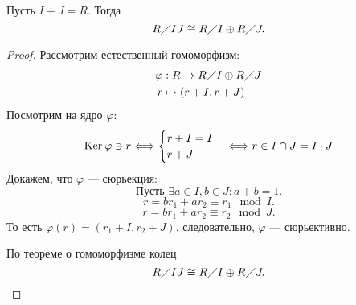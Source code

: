 \documentclass[11pt]{book}
\renewcommand{\ker}{{\mathop{\text{\rm Ker}}}\:}
\theoremstyle{definition}
\theoremstyle{plain}
\theoremstyle{plain}
\theoremstyle{definition}
\theoremstyle{remark}
\begin{document}
\begin{thm}
    Пусть $ I + J = R$. Тогда \[
	R \diagup  {IJ} \cong R \diagup I \oplus R \diagup  J
    .\] 
\end{thm}
\begin{proof}
    Рассмотрим естественный гомоморфизм:
    \begin{align*}
	\varphi & : R \to  R \diagup I \oplus R \diagup  J \\
	r & \mapsto (r + I, r + J)
    \end{align*}
    Посмотрим на ядро $ \varphi $:
    $$ \ker \varphi  \ni r \Longleftrightarrow 
    \begin{cases}
	    r + I = I \\
	    r + J
    \end{cases}
	 \Longleftrightarrow r \in  I \cap  J = I \cdot J
	$$
	Докажем, что $ \varphi $ --- сюрьекция:
	\[
	\text{Пусть } \exists  a \in I, b \in J: a + b = 1
	.\] 
	\[
	r = br_1+ar_2 \equiv r_1 \mod I
	.\] 
	\[
	r = br_1+ar_2 \equiv r_2 \mod J
	.\] 
	То есть $ \varphi (r) =  (r_1 + I, r_2 + J)$, следовательно, $ \varphi $ --- сюрьективно.

	По теореме о гомоморфизме колец \[
	    R \diagup {IJ} \cong R\diagup I \oplus R\diagup J
	.\] 
\end{proof}
\end{document}
